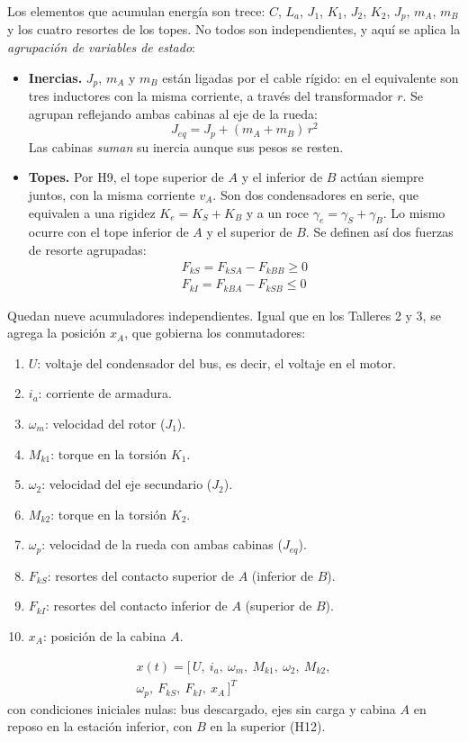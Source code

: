 \documentclass[10pt,a4paper,twocolumn]{article}
\begin{document}
Los elementos que acumulan energía son trece: $C$, $L_a$, $J_1$, $K_1$, $J_2$, $K_2$,
$J_p$, $m_A$, $m_B$ y los cuatro resortes de los topes. No todos son independientes, y aquí
se aplica la \emph{agrupación de variables de estado}:
\begin{itemize}
  \item \textbf{Inercias.} $J_p$, $m_A$ y $m_B$ están ligadas por el cable rígido: en el
        equivalente son tres inductores con la misma corriente, a través del
        transformador $r$. Se agrupan reflejando ambas cabinas al eje de la rueda:
        \begin{equation}
          J_{eq} = J_p + (m_A + m_B)\,r^2
          \label{eq:Jeq}
        \end{equation}
        Las cabinas \emph{suman} su inercia aunque sus pesos se resten.
  \item \textbf{Topes.} Por H9, el tope superior de $A$ y el inferior de $B$ actúan
        siempre juntos, con la misma corriente $v_A$. Son dos condensadores en serie, que
        equivalen a una rigidez $K_e = K_S + K_B$ y a un roce $\gamma_e = \gamma_S +
        \gamma_B$. Lo mismo ocurre con el tope inferior de $A$ y el superior de $B$. Se
        definen así dos fuerzas de resorte agrupadas:
        \begin{gather*}
          F_{kS} = F_{kSA} - F_{kBB} \ge 0 \\
          F_{kI} = F_{kBA} - F_{kSB} \le 0
        \end{gather*}
\end{itemize}
Quedan nueve acumuladores independientes. Igual que en los Talleres 2 y 3, se agrega la
posición $x_A$, que gobierna los conmutadores:
\begin{enumerate}
  \item $U$: voltaje del condensador del bus, es decir, el voltaje en el motor.
  \item $i_a$: corriente de armadura.
  \item $\omega_m$: velocidad del rotor ($J_1$).
  \item $M_{k1}$: torque en la torsión $K_1$.
  \item $\omega_2$: velocidad del eje secundario ($J_2$).
  \item $M_{k2}$: torque en la torsión $K_2$.
  \item $\omega_p$: velocidad de la rueda con ambas cabinas ($J_{eq}$).
  \item $F_{kS}$: resortes del contacto superior de $A$ (inferior de $B$).
  \item $F_{kI}$: resortes del contacto inferior de $A$ (superior de $B$).
  \item $x_A$: posición de la cabina $A$.
\end{enumerate}
\begin{multline*}
  x(t) = \big[\, U,\ i_a,\ \omega_m,\ M_{k1},\ \omega_2,\ M_{k2}, \\
  \omega_p,\ F_{kS},\ F_{kI},\ x_A \,\big]^{T}
\end{multline*}
con condiciones iniciales nulas: bus descargado, ejes sin carga y cabina $A$ en reposo en
la estación inferior, con $B$ en la superior (H12).
\end{document}

